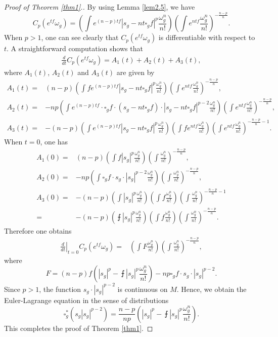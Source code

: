 \documentclass[12pt]{amsart}
\theoremstyle{plain}
\theoremstyle{definition}
\newcommand{\beq}{\begin{equation}}
\newcommand{\eeq}{\end{equation}}
\renewcommand{\>}{\rightarrow}
\renewcommand{\#}{\sharp}
\newcommand{\pdd}{\left.\frac{d}{dt}\right|_{t=0}}
\newcommand{\lrp}[1]{\left( #1\right)}
\numberwithin{equation}{section} %
\begin{document}
    \begin{proof}[Proof of Theorem \ref{thm1}.] By using    Lemma \ref{lem2.5}, we have
    \beq
    C_p(e^{tf}\omega_g)=\lrp{\int e^{(n-p)tf}|s_g-nt\square_g f|^p\frac{\omega^n_g}{n!}}\lrp{\int e^{ntf}\frac{\omega_g^n}{n!}}^{-\frac{n-p}{n}}.
    \eeq
    When $p>1$, one can see clearly that $C_p(e^{tf}\omega_g)$ is differentiable with respect to $t$. A straightforward computation shows that
    \begin{align*}
    \frac{d}{dt} C_p(e^{tf}\omega_g)=A_1(t)+A_2(t)+A_3(t),
    \end{align*}
    where $A_1(t)$, $A_2(t)$ and $A_3(t)$ are given by
    \begin{align*}
    A_1(t)=&(n-p)\lrp{\int fe^{(n-p)tf}\left|s_g-nt\square_g f\right|^p\frac{\omega^n_g}{n!}}\lrp{\int e^{ntf}\frac{\omega_g^n}{n!}}^{-\frac{n-p}{n}},\\
    A_2(t)=&-np\lrp{\int e^{(n-p)tf}\cdot \square_g f\cdot\left(s_g-nt\square_g f\right) \cdot \left|s_g-nt\square_g f\right|^{p-2}\frac{\omega^n_g}{n!}}\lrp{\int e^{ntf}\frac{\omega_g^n}{n!}}^{-\frac{n-p}{n}},\\
    A_3(t)=&-(n-p)\lrp{\int e^{(n-p)tf}\left|s_g-nt\square_g f\right|^p\frac{\omega^n_g}{n!}}\lrp{\int fe^{ntf}\frac{\omega_g^n}{n!}}\lrp{\int e^{ntf}\frac{\omega_g^n}{n!}}^{-\frac{n-p}{n}-1}.
    \end{align*}
    When $t=0$, one has
    \begin{align*}
    A_1(0)=&(n-p)\lrp{\int f|s_g|^p\frac{\omega^n_g}{n!}}\lrp{\int\frac{\omega_g^n}{n!}}^{-\frac{n-p}{n}},\\
    A_2(0)=&-np\lrp{\int \square_g f\cdot s_g\cdot |s_g|^{p-2}\frac{\omega^n_g}{n!}}\lrp{\int\frac{\omega_g^n}{n!}}^{-\frac{n-p}{n}},\\
    A_3(0)=&-(n-p)\lrp{\int|s_g|^p\frac{\omega^n_g}{n!}}\lrp{\int f\frac{\omega_g^n}{n!}}\lrp{\int\frac{\omega_g^n}{n!}}^{-\frac{n-p}{n}-1}\\
    =&-(n-p)\lrp{\intbar|s_g|^p\frac{\omega^n_g}{n!}}\lrp{\int f\frac{\omega_g^n}{n!}}\lrp{\int\frac{\omega_g^n}{n!}}^{-\frac{n-p}{n}}.
    \end{align*}
Therefore one obtains
    \begin{align*}
    \pdd C_p(e^{tf}\omega_g)=&\lrp{\int F\frac{\omega^n_g}{n!}}\lrp{\int \frac{\omega_g^n}{n!}}^{-\frac{n-p}{n}},
    \end{align*}
    where
    \beq F= (n-p)f\lrp{|s_g|^p-\intbar|s_g|^p\frac{\omega^n_g}{n!}}-np\square_g f\cdot s_g\cdot |s_g|^{p-2}.\eeq
    Since $p>1$, the function $s_g\cdot |s_g|^{p-2}$ is continuous on $M$. Hence, we obtain the Euler-Lagrange equation in the sense of distributions
    \beq
    \square_g^*\left(s_g|s_g|^{p-2}\right)=\frac{n-p}{np}\left(|s_g|^p-\intbar|s_g|^p\frac{\omega_g^n}{n!}\right).
    \eeq
        This completes the proof of Theorem \ref{thm1}.
\end{proof}
\end{document}
